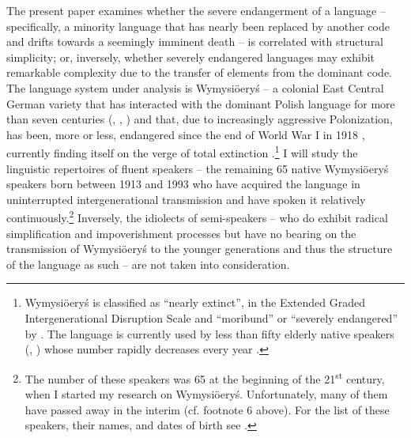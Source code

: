 \documentclass[output=paper,hidelinks]{langscibook}
\begin{document}
The present paper examines whether the severe endangerment of a language – specifically, a minority language that has nearly been replaced by another code and drifts towards a seemingly imminent death – is correlated with structural simplicity; or, inversely, whether severely endangered languages may exhibit remarkable complexity due to the transfer of elements from the dominant code. The language system under analysis is Wymysiöeryś – a colonial East Central German variety that has interacted with the dominant Polish language for more than seven centuries (\citealt[498]{putschke_ostmitteldeutsch_1980}, \citealt[497--498]{wiesinger_deutsche_1980}, \citealt{wicherkiewicz_making_2003}) and that, due to increasingly aggressive Polonization, has been, more or less, endangered since the end of World War I in 1918 \citep{neels_language_2016}, currently finding itself on the verge of total extinction \citep{andrason_grammar_2016}.\footnote{Wymysiöeryś is classified as “nearly extinct”, in the Extended Graded Intergenerational Disruption Scale and “moribund” or “severely endangered” by \citet{moseley_atlas_2010}. The language is currently used by less than fifty elderly native speakers (\citealt[73]{ritchie_language_2016}, \citealt[91]{chromik_wilamowice_2016}) whose number rapidly decreases every year \citep{andrason_grammar_2016, Andrason2021}.} I will study the linguistic repertoires of fluent speakers – the remaining 65 native Wymysiöeryś speakers born between 1913 and 1993 who have acquired the language in uninterrupted intergenerational transmission and have spoken it relatively continuously.\footnote{The number of these speakers was 65 at the beginning of the 21\textsuperscript{st} century, when I started my research on Wymysiöeryś. Unfortunately, many of them have passed away in the interim (cf. footnote 6 above). For the list of these speakers, their names, and dates of birth see \citet{Andrason2021}.} Inversely, the idiolects of semi-speakers -- who do exhibit radical simplification and impoverishment processes but have no bearing on the transmission of Wymysiöeryś to the younger generations and thus the structure of the language as such -- are not taken into consideration.
\end{document}
